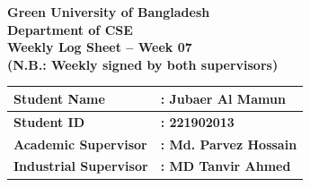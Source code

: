 \documentclass[a4paper,11pt]{article}
\begin{document}
\newpage

\begin{center}
    {\Large \textbf{Green University of Bangladesh}} \\[0.5em]
    {\large \textbf{Department of CSE}} \\[0.5em]
    {\large \textbf{Weekly Log Sheet -- Week 07}} \\[0.5em]
    {\color{red} \textbf{(N.B.: Weekly signed by both supervisors)}}
\end{center}

\vspace{1em}

\begin{tabularx}{\textwidth}{|l|X|}
\hline
\textbf{Student Name} & \textbf{: Jubaer Al Mamun} \\ \hline
\textbf{Student ID} & \textbf{: 221902013} \\ \hline
\textbf{Academic Supervisor} & \textbf{: Md. Parvez Hossain} \\ \hline
\textbf{Industrial Supervisor} & \textbf{: MD Tanvir Ahmed} \\ \hline
\end{tabularx}

\vspace{1em}
\end{document}

